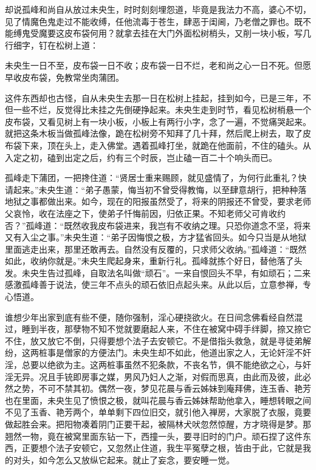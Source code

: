 \documentclass[a4paper,12pt,UTF8,twoside]{ctexbook}
\begin{document}
却说孤峰和尚自从放过未央生，时时刻刻埋怨道，毕竟是我法力不高，婆心不切，见了情魔色鬼走过不能收缚，任他流毒于苍生，肆恶于闺阃，乃老僧之罪也。既不能缚鬼受魔要这皮布袋何用？就拿去挂在大门外面松树梢头，又削一块小板，写几行细字，钉在松树上道：

未央生一日不至，皮布袋一日不收；皮布袋一日不烂，老和尚之心一日不死。但愿早收皮布袋，免教常坐肉蒲团。

这件东西却也古怪，自从未央生去那一日在松树上挂起，挂到如今，已是三年，不但一些不烂，反觉得比未挂之先倒硬挣起来。未央生走到时节，看见松树梢悬一个皮布袋，又看见树上有一块小板，小板上有两行小字，念了一遍，不觉痛哭起来。就把这条木板当做孤峰法像，跪在松树旁不知拜了几十拜，然后爬上树去，取了皮布袋下来，顶在头上，走入佛堂。遇着孤峰打坐，就跪在他面前，不住的磕头。从入定之初，磕到出定之后，约有三个时辰，岂止磕一百二十个响头而已。

孤峰走下蒲团，一把搀住道：“贤居士重来赐顾，就见盛情了，为何行此重礼？快请起来。”未央生道：“弟子愚蒙，悔当初不曾受得教悔，以至肆意胡行，把种种落地狱之事都做出来。如今，现在的阳报虽然受了，将来的阴报还不曾受，要求老师父哀怜，收在法座之下，使弟子忏悔前因，归依正果。不知老师父可肯收约否？”孤峰道：“既然收我皮布袋进来，我岂有不收纳之理。只恐你道念不坚，将来又有入尘之事。”未央生道：“弟子因悔恨之极，方才猛省回头。如今只当是从地狱里面逃走出来，那里还敢再去。自然没有反覆的，只求师父收纳。”孤峰道：“既然如此，收纳你就是。”未央生爬起身来，重新行礼。孤峰就拣个好日，替他落了头发。未央生告过孤峰，自取法名叫做“顽石”。一来自恨回头不早，有如顽石；二来感激孤峰善于说法，使三年不点头的顽石依旧点起头来。从此以后，立意参禅，专心悟道。

谁想少年出家到底有些不便，随你强制，淫心硬挠欲火。在日间念佛看经自然混过，睡到半夜，那孽物不知不觉就要磨起人来，不住在被窝中碍手绊脚，捺又捺它不住，放又放它不倒，只得要想个法子去安顿它。不是借指头救急，就是寻徒弟解纷，这两桩事是僧家的方便法门。未央生却不如此，他道出家之人，无论奸淫不奸淫，总要以绝欲为主。这两桩事虽然不犯条款，不丧名节，俱不能绝欲之心，与奸淫无异。况且手铳即房事之媒，男风乃妇人之渐，对假而思真，由此而及彼，此必然之势，不可不禁其初。偶然一夜，梦见花晨与香云姊妹到庵拜佛，连玉香、艳芳也在里面，未央生见了愤恨之极，就叫花晨与香云姊妹帮助他拿入，睡想转眼之间不见了玉香、艳芳两个，单单剩下四位旧交，就引他入禅房，大家脱了衣服，竟要做起胜会来。把阳物凑着阴门正要干起，被隔林犬吠忽然惊醒，方才晓得是梦。那翘然一物，竟在被窝里面东钻一下，西撞一头，要寻旧时的门户。顽石捏了这件东西，正要想个法子安顿它，又忽然止住道，我生平冤孽之根，皆由于此，它就是我的对头，如今怎么又放纵它起来。就止了妄念，要安睡一觉。
\end{document}
